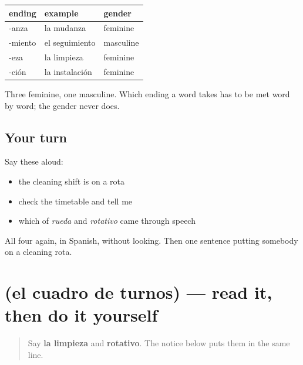 \begin{grammarlens}[title={Grammar Lens: the four noun-makers, complete}]
\noindent
\begin{tabularx}{\linewidth}{@{}>{\raggedright\arraybackslash}X>{\raggedright\arraybackslash}X>{\raggedright\arraybackslash}X@{}}
\toprule
\textbf{ending} & \textbf{example} & \textbf{gender} \\
\midrule
-anza & la mudanza & feminine \\
-miento & el seguimiento & masculine \\
-eza & la limpieza & feminine \\
-ción & la instalación & feminine \\
\bottomrule
\end{tabularx}

Three feminine, one masculine. Which ending a word takes has to be met word by word; the gender never does.
\end{grammarlens}

\subsection*{Your turn}
Say these aloud:

\begin{itemize}
\raggedright
  \item the cleaning shift is on a rota
  \item check the timetable and tell me
  \item which of \emph{rueda} and \emph{rotativo} came through speech
\end{itemize}

\begin{tcolorbox}[breakable,colback=teal!4,colframe=teal!35!black,title={Before you move on}]
All four again, in Spanish, without looking. Then one sentence putting somebody on a cleaning rota.
\end{tcolorbox}
\section[Practice]{(el cuadro de turnos) — read it, then do it yourself}

\label{lesson:ES-C453-sintesis-limpieza}



\begin{quote}
Say \textbf{la limpieza} and \textbf{rotativo}. The notice below puts them in the same line.
\end{quote}

